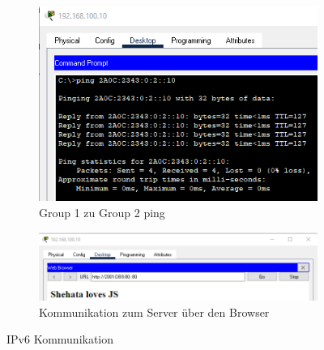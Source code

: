 \begin{figure}[!htb]
    \centering
    \begin{subfigure}{.49\textwidth}
        \includegraphics[width=\textwidth,height=.88\textwidth,keepaspectratio]{./img/config/test_ipv6.png}
        \caption{Group 1 zu Group 2 ping}
    \end{subfigure}
    \begin{subfigure}{.49\textwidth}
        \includegraphics[width=\textwidth,height=.88\textwidth,keepaspectratio]{./img/config/test_server.png}
        \caption{Kommunikation zum Server über den Browser}
    \end{subfigure}
    \caption{IPv6 Kommunikation}
\end{figure}
\pagebreak


